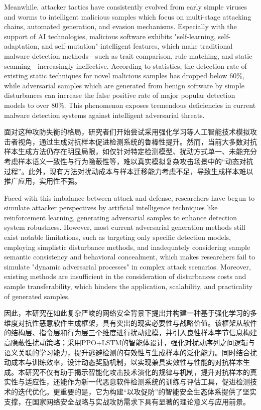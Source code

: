 Meanwhile, attacker tactics have consistently evolved from early simple viruses and worms to intelligent malicious samples which focus on multi-stage attacking chains, automated generation, and evasion mechanisms. Especially with the support of AI technologies, malicious software exhibits "self-learning, self-adaptation, and self-mutation" intelligent features, which make traditional malware detection methods—such as trait comparison, rule matching, and static scanning—increasingly ineffective\cite{chen2018study, ren2021matching, lipp2022empirical}. According to statistics, the detection rate of existing static techniques for novel malicious samples has dropped below 60\%, while adversarial samples which are generated from benign software by simple disturbances can increase the false positive rate of major popular detection models to over 80\%. This phenomenon exposes tremendous deficiencies in current malware detection systems against intelligent adversarial threats.

面对这种攻防失衡的格局，研究者们开始尝试采用强化学习等人工智能技术模拟攻击者视角，通过生成对抗样本促进检测系统的鲁棒性提升。然而，当前大多数对抗样本生成方法仍存在明显局限，如仅针对特定检测模型、扰动方式单一、未能充分考虑样本语义一致性与行为隐蔽性等，难以真实模拟复杂攻击场景中的“动态对抗过程”\cite{yu2022natural, ilahi2021challenges, labaca2021aimed,standen2025adversarial}。此外，现有方法对扰动成本与样本迁移能力考虑不足，导致生成样本难以推广应用，实用性不强。

Faced with this imbalance between attack and defense, researchers have begun to simulate attacker perspectives by artificial intelligence techniques like reinforcement learning, generating adversarial samples to enhance detection system robustness. However, most current adversarial generation methods still exist notable limitations, such as targeting only specific detection models, employing simplistic disturbance methods, and inadequately considering sample semantic consistency and behavioral concealment, which makes researchers fail to simulate "dynamic adversarial processes" in complex attack scenarios\cite{yu2022natural, ilahi2021challenges, labaca2021aimed,standen2025adversarial}. Moreover, existing methods are insufficient in the consideration of disturbances costs and sample transferability, which hinders the application, scalability, and practicality of generated samples.

因此，本研究在如此复杂严峻的网络安全背景下提出并构建一种基于强化学习的多维度对抗性恶意软件生成框架，具有突出的现实必要性与战略价值。该框架从软件的结构层、指令层和行为层三个维度进行扰动建模，并引入良性样本字节信息构建高隐蔽性扰动策略；采用PPO+LSTM的智能体设计，强化对扰动序列之间逻辑与语义关联的学习能力，提升逃避检测的有效性与生成样本的泛化能力。同时结合扰动成本与训练效率，设计动态奖励机制，以实现兼具实效性与性能的对抗样本生成。本研究不仅有助于揭示智能化攻击技术演化的规律与机制，提升对抗样本的真实性与适应性，还能作为新一代恶意软件检测系统的训练与评估工具，促进检测技术的迭代优化。更重要的是，它为构建“以攻促防”的智能安全生态体系提供了坚实支撑，在国家网络安全战略与实战攻防需求下具有显著的理论意义与应用前景。


